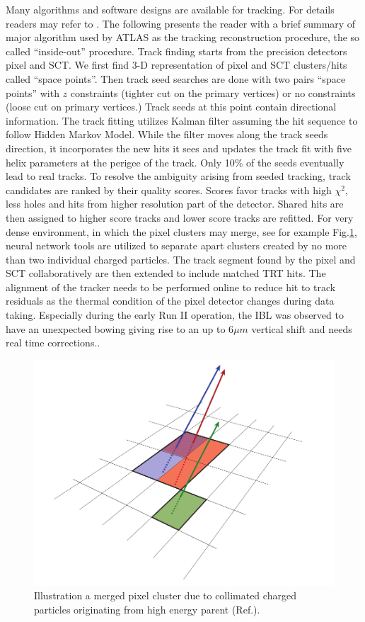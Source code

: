 \label{sec:reco-tracking}
Many algorithms and software designs are available for tracking. For details readers may refer to \cite{Cornelissen:1020106}. The following presents the reader with a brief summary of major algorithm used by ATLAS as the tracking reconstruction procedure, the so called ``inside-out'' procedure. Track finding starts from the precision detectors pixel and SCT. We first find 3-D representation of pixel and SCT clusters/hits called ``space points''. Then track seed searches are done with two pairs ``space points'' with $z$ constraints (tighter cut on the primary vertices) or no constraints (loose cut on primary vertices.) Track seeds at this point contain directional information. The track fitting utilizes Kalman filter assuming the hit sequence to follow Hidden Markov Model. While the filter moves along the track seeds direction, it incorporates the new hits it sees and updates the track fit with five helix parameters at the perigee of the track. Only 10\% of the seeds eventually lead to real tracks. To resolve the ambiguity arising from seeded tracking, track candidates are ranked by their quality scores. Scores favor tracks with high $\chi^2$, less holes and hits from higher resolution part of the detector. Shared hits are then assigned to higher score tracks and lower score tracks are refitted. For very dense environment, in which the pixel clusters may merge, see for example Fig.\ref{fig:reco-trackingcluster}, neural network tools are utilized to separate apart clusters created by no more than two individual charged particles\cite{PERF-2012-05,Aaboud:2017all}. The track segment found by the pixel and SCT collaboratively are then extended to include matched TRT hits. The alignment of the tracker needs to be performed online to reduce hit to track residuals as the thermal condition of the pixel detector changes during data taking. Especially during the early Run II operation, the IBL was observed to have an unexpected bowing giving rise to an up to 6$\mu m$ vertical shift and needs real time corrections.\cite{tracking-align}.

\begin{figure}[htpb!]
\begin{center}
  \includegraphics[width=0.55\linewidth]{figures/Reco/TrackingClusterB}
  \caption{ Illustration a merged pixel cluster due to collimated charged particles originating from high energy parent (Ref.\cite{Aaboud:2017all}). }
\label{fig:reco-trackingcluster}
\end{center}
\end{figure}


